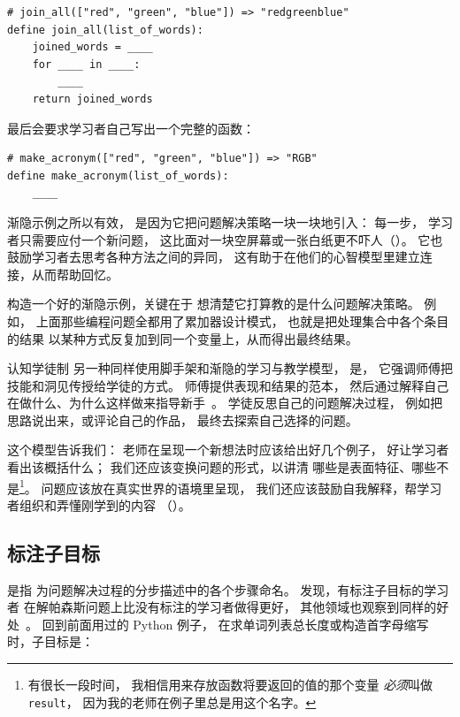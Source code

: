 \begin{verbatim}
# join_all(["red", "green", "blue"]) => "redgreenblue"
define join_all(list_of_words):
    joined_words = ____
    for ____ in ____:
        ____
    return joined_words
\end{verbatim}

最后会要求学习者自己写出一个完整的函数：

\begin{verbatim}
# make_acronym(["red", "green", "blue"]) => "RGB"
define make_acronym(list_of_words):
    ____
\end{verbatim}

渐隐示例之所以有效，
是因为它把问题解决策略一块一块地引入：
每一步，
学习者只需要应付一个新问题，
这比面对一块空屏幕或一张白纸更不吓人（）。
它也鼓励学习者去思考各种方法之间的异同，
这有助于在他们的心智模型里建立连接，从而帮助回忆。

构造一个好的渐隐示例，关键在于
想清楚它打算教的是什么问题解决策略。
例如，
上面那些编程问题全都用了累加器设计模式，
也就是把处理集合中各个条目的结果
以某种方式反复加到同一个变量上，从而得出最终结果。

\begin{aside}{认知学徒制}
  另一种同样使用脚手架和渐隐的学习与教学模型，
  是，
  它强调师傅把技能和洞见传授给学徒的方式。
  师傅提供表现和结果的范本，
  然后通过解释自己在做什么、为什么这样做来指导新手~\cite{Coll1991,Casp2007}。
  学徒反思自己的问题解决过程，
  例如把思路说出来，或评论自己的作品，
  最终去探索自己选择的问题。

  这个模型告诉我们：
  老师在呈现一个新想法时应该给出好几个例子，
  好让学习者看出该概括什么；
  我们还应该变换问题的形式，以讲清
  哪些是表面特征、哪些不是\footnote{有很长一段时间，
    我相信用来存放函数将要返回的值的那个变量
    \emph{必须}叫做 \texttt{result}，
    因为我的老师在例子里总是用这个名字。}。
  问题应该放在真实世界的语境里呈现，
  我们还应该鼓励自我解释，帮学习者组织和弄懂刚学到的内容
  （）。
\end{aside}

\subsection*{标注子目标}

是指
为问题解决过程的分步描述中的各个步骤命名。
\cite{Marg2016,Morr2016}发现，有标注子目标的学习者
在解帕森斯问题上比没有标注的学习者做得更好，
其他领域也观察到同样的好处~\cite{Marg2012}。
回到前面用过的 Python 例子，
在求单词列表总长度或构造首字母缩写时，子目标是：

